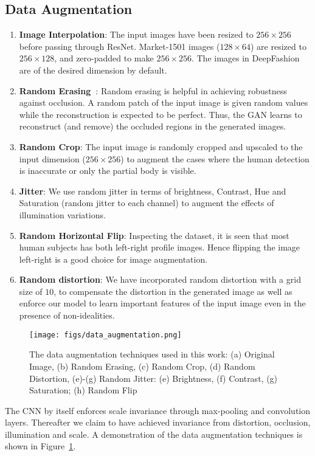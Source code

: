 \documentclass[runningheads]{llncs}
\begin{document}
\subsection{Data Augmentation}
\begin{enumerate}
	\item \textbf{Image Interpolation}: The input images have been resized to $256\times 256$ before passing through ResNet. Market-1501 images ($128\times 64$) are resized to $256\times 128$, and zero-padded to make $256\times 256$. The images in DeepFashion are of the desired dimension by default.
	\item \textbf{Random Erasing~\cite{randomerasing}}: Random erasing is helpful in achieving robustness against occlusion. A random patch of the input image is given random values while the reconstruction is expected to be perfect. Thus, the GAN learns to reconstruct (and remove) the occluded regions in the generated images.
	\item \textbf{Random Crop}: The input image is randomly cropped and upscaled to the input dimension ($256\times 256$) to augment the cases where the human detection is inaccurate or only the partial body is visible.
	\item \textbf{Jitter}: We use random jitter in terms of brightness, Contrast, Hue and Saturation (random jitter to each channel) to augment the effects of illumination variations.
	\item \textbf{Random Horizontal Flip}: Inspecting the dataset, it is seen that most human subjects has both left-right profile images. Hence flipping the image left-right is a good choice for image augmentation.
	\item \textbf{Random distortion}: We have incorporated random distortion with a grid size of $10$, to compensate the distortion in the generated image as well as enforce our model to learn important features of the input image even in the presence of non-idealities. 
\end{enumerate}
%
\begin{figure}[H]
	\centering
	\texttt{[image: figs/data\_augmentation.png]}
	\caption{The data augmentation techniques used in this work: (a) Original Image, (b) Random Erasing, (c) Random Crop, (d) Random Distortion, (e)-(g) Random Jitter: (e) Brightness, (f) Contrast, (g) Saturation; (h) Random Flip}
	\label{fig:data_augmentation}
\end{figure}
The CNN by itself enforces scale invariance through max-pooling and convolution layers. Thereafter we claim to have achieved invariance from distortion, occlusion, illumination and scale. A demonstration of the data augmentation techniques is shown in Figure~\ref{fig:data_augmentation}.
%
%
\end{document}
